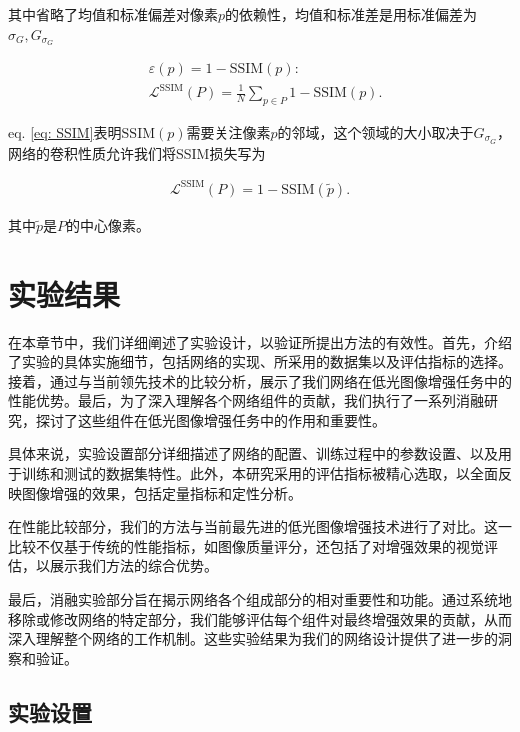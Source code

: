\documentclass[a4paper]{ctexart}
\begin{document}
其中省略了均值和标准偏差对像素$p$的依赖性，均值和标准差是用标准偏差为$\sigma_G,G_{\sigma_G}$

\begin{equation}
	\begin{aligned}
		&\varepsilon(p)=1-\text{SSIM}(p): \\  &\mathcal{L}^{\text{SSIM}}(P)=\frac{1}{N}\sum_{p \in P}1-\text{SSIM}(p).
	\end{aligned}
	\label{eq: SSIM loss}
\end{equation}

eq. \ref{eq: SSIM}表明$\text{SSIM}(p)$需要关注像素$p$的邻域，这个领域的大小取决于$G_{\sigma_G}$，网络的卷积性质允许我们将SSIM损失写为

\begin{equation}
	\begin{aligned}
		\mathcal{L}^{\text{SSIM}}(P)=1-\text{SSIM}(\tilde{p}).
	\end{aligned}
	\label{eq: revised_SSIM loss}
\end{equation}

其中$\tilde{p}$是$P$的中心像素。

\section{实验结果}

在本章节中，我们详细阐述了实验设计，以验证所提出方法的有效性。首先，介绍了实验的具体实施细节，包括网络的实现、所采用的数据集以及评估指标的选择。接着，通过与当前领先技术的比较分析，展示了我们网络在低光图像增强任务中的性能优势。最后，为了深入理解各个网络组件的贡献，我们执行了一系列消融研究，探讨了这些组件在低光图像增强任务中的作用和重要性。

具体来说，实验设置部分详细描述了网络的配置、训练过程中的参数设置、以及用于训练和测试的数据集特性。此外，本研究采用的评估指标被精心选取，以全面反映图像增强的效果，包括定量指标和定性分析。

在性能比较部分，我们的方法与当前最先进的低光图像增强技术进行了对比。这一比较不仅基于传统的性能指标，如图像质量评分，还包括了对增强效果的视觉评估，以展示我们方法的综合优势。

最后，消融实验部分旨在揭示网络各个组成部分的相对重要性和功能。通过系统地移除或修改网络的特定部分，我们能够评估每个组件对最终增强效果的贡献，从而深入理解整个网络的工作机制。这些实验结果为我们的网络设计提供了进一步的洞察和验证。

\subsection{实验设置}
\end{document}
